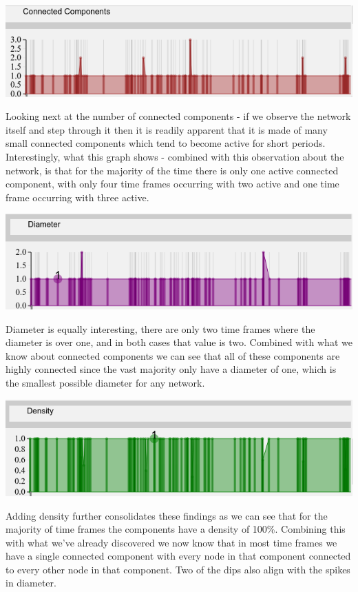 \begin{center}
\includegraphics[trim={0 0 0 0}, width=140mm]{./Figures/TurinConnectedComponents.png}
\end{center}  
Looking next at the number of connected components - if we observe the network itself and step through it then it is readily apparent that it is made of many small connected components which tend to become active for short periods. Interestingly, what this graph shows - combined with this observation about the network, is that for the majority of the time there is only one active connected component, with only four time frames occurring with two active and one time frame occurring with three active.

\begin{center}
\includegraphics[trim={0 0 0 0}, width=140mm]{./Figures/TurinDiameter.png}
\end{center}
Diameter is equally interesting, there are only two time frames where the diameter is over one, and in both cases that value is two. Combined with what we know about connected components we can see that all of these components are highly connected since the vast majority only have a diameter of one, which is the smallest possible diameter for any network.
    
\begin{center}
\includegraphics[trim={0 0 0 0}, width=140mm]{./Figures/TurinDensity.png}
\end{center}    
Adding density further consolidates these findings as we can see that for the majority of time frames the components have a density of 100\%. Combining this with what we've already discovered we now know that in most time frames we have a single connected component with every node in that component connected to every other node in that component. Two of the dips also align with the spikes in diameter.

